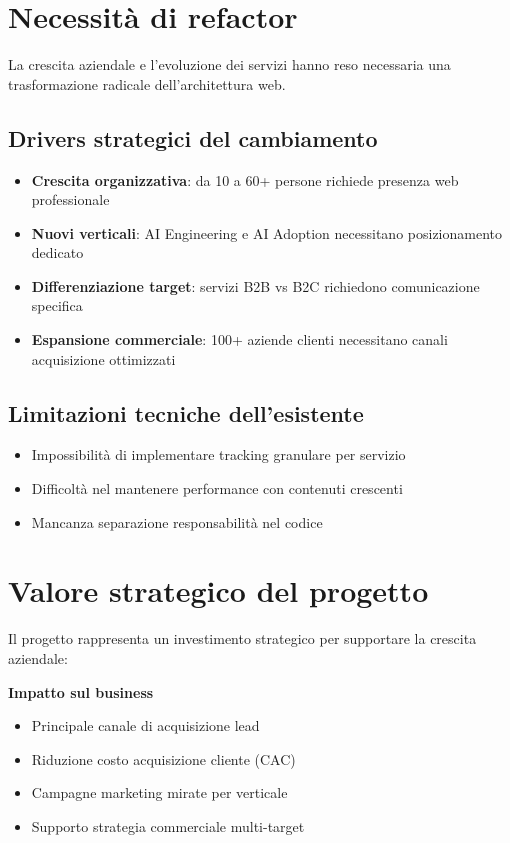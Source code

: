 \section{Necessità di refactor}
La crescita aziendale e l'evoluzione dei servizi hanno reso necessaria 
una trasformazione radicale dell'architettura web.

\subsection{Drivers strategici del cambiamento}
\begin{itemize}
  \item \textbf{Crescita organizzativa}: da 10 a 60+ persone 
        richiede presenza web professionale
  \item \textbf{Nuovi verticali}: AI Engineering e AI Adoption 
        necessitano posizionamento dedicato
  \item \textbf{Differenziazione target}: servizi B2B vs B2C richiedono 
        comunicazione specifica
  \item \textbf{Espansione commerciale}: 100+ aziende clienti necessitano 
        canali acquisizione ottimizzati
\end{itemize}

\subsection{Limitazioni tecniche dell'esistente}
\begin{itemize}
  \item Impossibilità di implementare tracking granulare per servizio
  \item Difficoltà nel mantenere performance con contenuti crescenti
  \item Mancanza separazione responsabilità nel codice
\end{itemize}

\section{Valore strategico del progetto}
Il progetto rappresenta un investimento strategico per supportare la 
crescita aziendale:

\textbf{Impatto sul business}
\begin{itemize}
  \item Principale canale di acquisizione lead
  \item Riduzione costo acquisizione cliente (CAC)
  \item Campagne marketing mirate per verticale
  \item Supporto strategia commerciale multi-target
\end{itemize}

